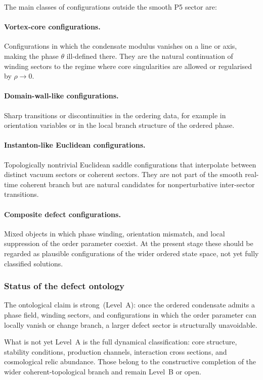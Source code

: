 The main classes of configurations outside the smooth P5 sector are:

\paragraph{Vortex-core configurations.}
Configurations in which the condensate modulus vanishes on a line or
axis, making the phase $\theta$ ill-defined there.
They are the natural continuation of winding sectors to the regime
where core singularities are allowed or regularised by $\rho\to 0$.

\paragraph{Domain-wall-like configurations.}
Sharp transitions or discontinuities in the ordering data, for example
in orientation variables or in the local branch structure of the
ordered phase.

\paragraph{Instanton-like Euclidean configurations.}
Topologically nontrivial Euclidean saddle configurations that
interpolate between distinct vacuum sectors or coherent sectors.
They are not part of the smooth real-time coherent branch but are
natural candidates for nonperturbative inter-sector transitions.

\paragraph{Composite defect configurations.}
Mixed objects in which phase winding, orientation mismatch, and local
suppression of the order parameter coexist.
At the present stage these should be regarded as plausible
configurations of the wider ordered state space, not yet fully
classified solutions.

\subsubsection*{Status of the defect ontology}

The ontological claim is strong~(Level~A): once the ordered condensate
admits a phase field, winding sectors, and configurations in which the
order parameter can locally vanish or change branch, a larger defect
sector is structurally unavoidable.

What is not yet Level~A is the full dynamical classification: core
structure, stability conditions, production channels, interaction cross
sections, and cosmological relic abundance.
Those belong to the constructive completion of the wider
coherent-topological branch and remain Level~B or open.

